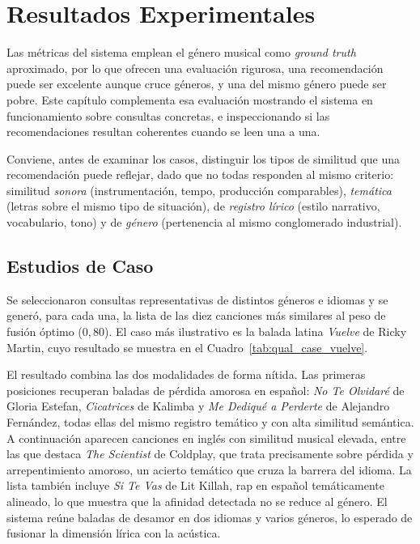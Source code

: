 \chapter{Resultados Experimentales}
\label{ch:resultados}

Las métricas del sistema emplean el género musical como \textit{ground truth} aproximado, por lo que ofrecen una evaluación rigurosa, una recomendación puede ser excelente aunque cruce géneros, y una del mismo género puede ser pobre. Este capítulo complementa esa evaluación mostrando el sistema en funcionamiento sobre consultas concretas, e inspeccionando si las recomendaciones resultan coherentes cuando se leen una a una.

Conviene, antes de examinar los casos, distinguir los tipos de similitud que una recomendación puede reflejar, dado que no todas responden al mismo criterio: similitud \emph{sonora} (instrumentación, tempo, producción comparables), \emph{temática} (letras sobre el mismo tipo de situación), de \emph{registro lírico} (estilo narrativo, vocabulario, tono) y de \emph{género} (pertenencia al mismo conglomerado industrial).

\section{Estudios de Caso}
\label{sec:estudios-caso}

Se seleccionaron consultas representativas de distintos géneros e idiomas y se generó, para cada una, la lista de las diez canciones más similares al peso de fusión óptimo ($0{,}80$). El caso más ilustrativo es la balada latina \emph{Vuelve} de Ricky Martin, cuyo resultado se muestra en el Cuadro~\ref{tab:qual_case_vuelve}.

El resultado combina las dos modalidades de forma nítida. Las primeras posiciones recuperan baladas de pérdida amorosa en español: \emph{No Te Olvidaré} de Gloria Estefan, \emph{Cicatrices} de Kalimba y \emph{Me Dediqué a Perderte} de Alejandro Fernández, todas ellas del mismo registro temático y con alta similitud semántica. A continuación aparecen canciones en inglés con similitud musical elevada, entre las que destaca \emph{The Scientist} de Coldplay, que trata precisamente sobre pérdida y arrepentimiento amoroso, un acierto temático que cruza la barrera del idioma. La lista también incluye \emph{Si Te Vas} de Lit Killah, rap en español temáticamente alineado, lo que muestra que la afinidad detectada no se reduce al género. El sistema reúne baladas de desamor en dos idiomas y varios géneros, lo esperado de fusionar la dimensión lírica con la acústica.

